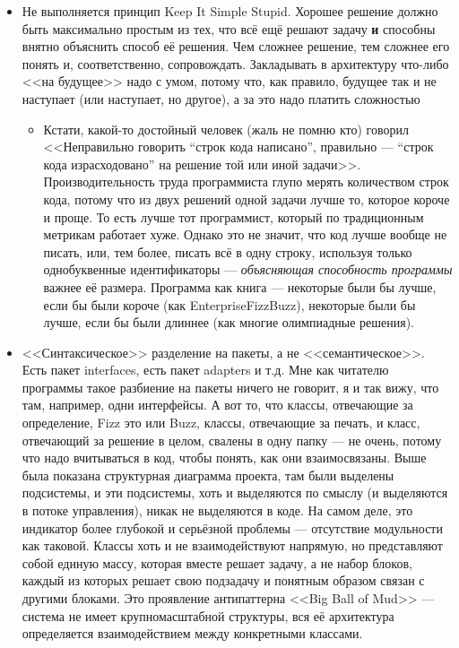 \documentclass[a5paper]{article}
\begin{document}
\begin{itemize}
    \item Не выполняется принцип Keep It Simple Stupid. Хорошее решение должно быть максимально простым из тех, что всё ещё решают задачу \textbf{и} способны внятно объяснить способ её решения. Чем сложнее решение, тем сложнее его понять и, соответственно, сопровождать. Закладывать в архитектуру что-либо <<на будущее>> надо с умом, потому что, как правило, будущее так и не наступает (или наступает, но другое), а за это надо платить сложностью
    \begin{itemize}
        \item Кстати, какой-то достойный человек (жаль не помню кто) говорил <<Неправильно говорить ``строк кода написано'', правильно --- ``строк кода израсходовано'' на решение той или иной задачи>>. Производительность труда программиста глупо мерять количеством строк кода, потому что из двух решений одной задачи лучше то, которое короче и проще. То есть лучше тот программист, который по традиционным метрикам работает хуже. Однако это не значит, что код лучше вообще не писать, или, тем более, писать всё в одну строку, используя только однобуквенные идентификаторы --- \textit{объясняющая способность программы} важнее её размера. Программа как книга --- некоторые были бы лучше, если бы были короче (как EnterpriseFizzBuzz), некоторые были бы лучше, если бы были длиннее (как многие олимпиадные решения).
    \end{itemize}
    \item <<Синтаксическое>> разделение на пакеты, а не <<семантическое>>. Есть пакет interfaces, есть пакет adapters и т.д. Мне как читателю программы такое разбиение на пакеты ничего не говорит, я и так вижу, что там, например, одни интерфейсы. А вот то, что классы, отвечающие за определение, Fizz это или Buzz, классы, отвечающие за печать, и класс, отвечающий за решение в целом, свалены в одну папку --- не очень, потому что надо вчитываться в код, чтобы понять, как они взаимосвязаны. Выше была показана структурная диаграмма проекта, там были выделены подсистемы, и эти подсистемы, хоть и выделяются по смыслу (и выделяются в потоке управления), никак не выделяются в коде. На самом деле, это индикатор более глубокой и серьёзной проблемы --- отсутствие модульности как таковой. Классы хоть и не взаимодействуют напрямую, но представляют собой единую массу, которая вместе решает задачу, а не набор блоков, каждый из которых решает свою подзадачу и понятным образом связан с другими блоками. Это проявление антипаттерна <<Big Ball of Mud>> --- система не имеет крупномасштабной структуры, вся её архитектура определяется взаимодействием между конкретными классами.

\end{itemize}
\end{document}
